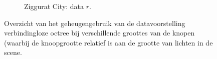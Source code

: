 \begin{figure}[p]
\begin{adjustbox}{minipage=\textwidth, scale=0.6}
  \end{adjustbox} %
  \begin{adjustbox}{minipage=\textwidth, scale=0.6}
    \begin{subfigure}[b]{0.7\textwidth}
      \centering
      \def\svgwidth{\textwidth}
      
      \caption{Ziggurat City: data $r$.}
      \label{fig:hs-nodesize-::zc-dr}
    \end{subfigure}
  \end{adjustbox}
  \caption{Overzicht van het geheugengebruik van de datavoorstelling verbindingloze octree
           bij verschillende groottes van de knopen (waarbij de knoopgrootte
           relatief is aan de grootte van lichten in de scene.}
  \label{fig:hs-nodesize-memory}
\end{figure}


